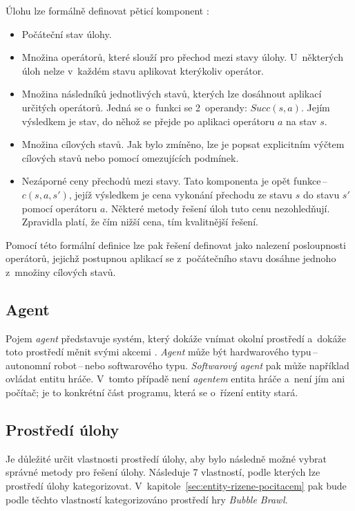 Úlohu lze formálně definovat pěticí komponent \cite{AI_Russel_Norvig}:
\begin{itemize}
    \item Počáteční stav úlohy.
    \item Množina operátorů, které slouží pro přechod mezi stavy úlohy. U~některých úloh nelze v~každém stavu aplikovat kterýkoliv operátor.
    \item Množina následníků jednotlivých stavů, kterých lze dosáhnout aplikací určitých operátorů. Jedná se o~funkci se 2~operandy: ${Succ(s, a)}$. Jejím výsledkem je stav, do něhož se přejde po aplikaci operátoru $a$ na stav $s$.
    \item Množina cílových stavů. Jak bylo zmíněno, lze je popsat explicitním výčtem cílových stavů nebo pomocí omezujících podmínek.
    \item Nezáporné ceny přechodů mezi stavy. Tato komponenta je opět funkce\,--\,${c(s, a, s')}$, jejíž výsledkem je cena vykonání přechodu ze stavu $s$ do stavu $s'$ pomocí operátoru $a$. Některé metody řešení úloh tuto cenu nezohledňují. Zpravidla platí, že čím nižší cena, tím kvalitnější řešení.
\end{itemize}
Pomocí této formální definice lze pak řešení definovat jako nalezení posloupnosti operátorů, jejichž postupnou aplikací se z~počátečního stavu dosáhne jednoho z~množiny cílových stavů.

\subsection*{Agent}

Pojem \emph{agent} představuje systém, který dokáže vnímat okolní prostředí a~dokáže toto prostředí měnit svými akcemi \cite{AI_Ertel, AI_Russel_Norvig}. \emph{Agent} může být hardwarového typu\,--\,autonomní robot\,--\,nebo softwarového typu. \emph{Softwarový agent} pak může například ovládat entitu hráče. V~tomto případě není \emph{agentem} entita hráče a~není jím ani počítač; je to konkrétní část programu, která se o~řízení entity stará.

\subsection*{Prostředí úlohy}

Je důležité určit vlastnosti prostředí úlohy, aby bylo následně možné vybrat správné metody pro řešení úlohy. Následuje 7 vlastností, podle kterých lze prostředí úlohy kategorizovat. V~kapitole~\ref{sec:entity-rizene-pocitacem} pak bude podle těchto vlastností kategorizováno prostředí hry \emph{Bubble Brawl}.

